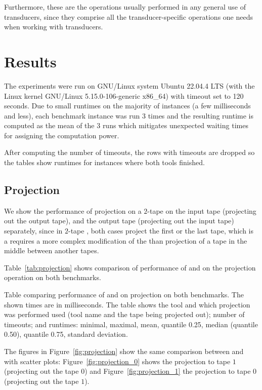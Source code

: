 Furthermore, these are the operations usually performed in any general use of transducers, since they comprise all the transducer-specific operations one needs when working with transducers.

\section{Results}

The experiments were run on GNU/Linux system Ubuntu 22.04.4 LTS (with the Linux kernel GNU/Linux 5.15.0-106-generic x86\_64) with timeout set to 120 seconds. Due to small runtimes on the majority of instances (a few milliseconds and less), each benchmark instance was run $3$ times and the resulting runtime is computed as the mean of the $3$ runs which mitigates unexpected waiting times for assigning the computation power.

After computing the number of timeouts, the rows with timeouts are dropped so the tables show runtimes for instances where both tools finished.

\subsection{Projection}

We show the performance of projection on a $2$-tape \nfts on the input tape (projecting out the output tape), and the output tape (projecting out the input tape) separately, since in $2$-tape \nfts, both cases project the first or the last tape, which is a requires a more complex modification of the \nft than projection of a tape in the middle between another tapes.

Table~\ref{tab:projection} shows comparison of performance of \mata and \mona on the projection operation on both benchmarks.

\begin{table}[ht]
  \centering
  
  \caption{
    Table comparing performance of \mata and \mona on projection on both benchmarks.
    The shown times are in milliseconds.
    The table shows the tool and which projection was performed used (tool name and the tape being projected out); number of timeouts; and runtimes: minimal, maximal, mean, quantile 0.25, median (quantile 0.50), quantile 0.75, standard deviation.
  }
  \label{tab:projection}
\end{table}

The figures in Figure~\ref{fig:projection} show the same comparison between \mata and \mona with scatter plots: Figure~\ref{fig:projection_0} shows the projection to tape $1$ (projecting out the tape $0$) and Figure~\ref{fig:projection_1} the projection to tape $0$ (projecting out the tape $1$).

